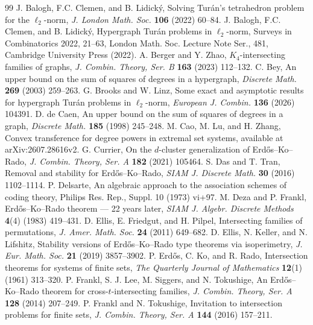 \documentclass[10pt,a4paper]{amsart}
\numberwithin{equation}{section}
\begin{document}
\begin{thebibliography}{99}
 J. Balogh, F.C. Clemen, and B. Lidick\'y, Solving Tur\'an's tetrahedron problem for the $\ell_2$-norm, {\em J. London Math. Soc.} {\bf 106} (2022) 60--84.
 J. Balogh, F.C. Clemen, and B. Lidick\'y, Hypergraph Tur\'an problems in $\ell_2$-norm, Surveys in Combinatorics 2022, 21--63, London Math. Soc. Lecture Note Ser., 481, Cambridge University Press (2022).
 A. Berger and Y. Zhao, $K_4$-intersecting families of graphs, {\em J. Combin. Theory, Ser. B} {\bf 163} (2023) 112--132.
 C. Bey, An upper bound on the sum of squares of degrees in a hypergraph, {\em Discrete Math.} {\bf 269} (2003) 259--263.
 G. Brooks and W. Linz, Some exact and asymptotic results for hypergraph Tur\'an problems in $\ell_2$-norm, {\em European J. Combin.} {\bf 136} (2026) 104391.
 D. de Caen, An upper bound on the sum of squares of degrees in a graph, {\em Discrete Math.} {\bf 185} (1998) 245--248.
 M. Cao, M. Lu, and H. Zhang, Convex transference for degree powers in extremal set systems, available at arXiv:2607.28616v2.
 G. Currier, On the $d$-cluster generalization of Erd\H{o}s--Ko--Rado, {\em J. Combin. Theory, Ser. A} {\bf 182} (2021) 105464.
 S. Das and T. Tran, Removal and stability for Erd\H{o}s--Ko--Rado, {\em SIAM J. Discrete Math.} {\bf 30} (2016) 1102--1114.
 P. Delsarte, An algebraic approach to the association schemes of coding theory, Philips Res. Rep., Suppl. 10 (1973) vi+97.
 M. Deza and P. Frankl, Erd\H{o}s--Ko--Rado theorem --- 22 years later, {\em SIAM J. Algebr. Discrete Methods} {\bf 4}(4) (1983) 419--431.
 D. Ellis, E. Friedgut, and H. Pilpel, Intersecting families of permutations, {\em J. Amer. Math. Soc.} {\bf 24} (2011) 649--682.
 D. Ellis, N. Keller, and N. Lifshitz, Stability versions of Erd\H{o}s--Ko--Rado type theorems via isoperimetry, {\em J. Eur. Math. Soc.} {\bf 21} (2019) 3857--3902.
 P. Erd\H{o}s, C. Ko, and R. Rado, Intersection theorems for systems of finite sets, {\em The Quarterly Journal of Mathematics} {\bf 12}(1) (1961) 313--320.
 P. Frankl, S. J. Lee, M. Siggers, and N. Tokushige, An Erd\H{o}s--Ko--Rado theorem for cross-$t$-intersecting families, {\em J. Combin. Theory, Ser. A} {\bf 128} (2014) 207--249.
 P. Frankl and N. Tokushige, Invitation to intersection problems for finite sets, {\em J. Combin. Theory, Ser. A} {\bf 144} (2016) 157--211.

\end{thebibliography}
\end{document}
